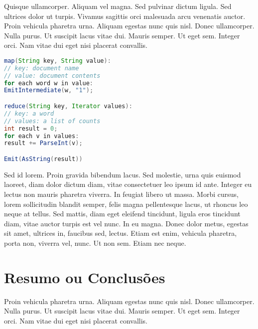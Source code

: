 Quisque ullamcorper. Aliquam vel magna. Sed pulvinar dictum
ligula. Sed ultrices dolor ut turpis. Vivamus sagittis orci malesuada
arcu venenatis auctor. Proin vehicula pharetra urna. Aliquam egestas
nunc quis nisl. Donec ullamcorper. Nulla purus. Ut suscipit lacus
vitae dui. Mauris semper. Ut eget sem. Integer orci. Nam vitae dui
eget nisi placerat convallis. 

\begin{lstlisting}[float,language=Java, label=src:mapreduce, caption=Example map and reduce functions for word counting]
map(String key, String value): 
// key: document name 
// value: document contents 
for each word w in value:
EmitIntermediate(w, "1");

reduce(String key, Iterator values):
// key: a word 
// values: a list of counts 
int result = 0;
for each v in values: 
result += ParseInt(v);

Emit(AsString(result))
\end{lstlisting}

Sed id lorem. Proin gravida bibendum lacus. Sed molestie, urna quis
euismod laoreet, diam dolor dictum diam, vitae consectetuer leo ipsum
id ante. Integer eu lectus non mauris pharetra viverra. In feugiat
libero ut massa. Morbi cursus, lorem sollicitudin blandit semper,
felis magna pellentesque lacus, ut rhoncus leo neque at tellus. Sed
mattis, diam eget eleifend tincidunt, ligula eros tincidunt diam,
vitae auctor turpis est vel nunc. In eu magna. Donec dolor metus,
egestas sit amet, ultrices in, faucibus sed, lectus. Etiam est enim,
vehicula pharetra, porta non, viverra vel, nunc. Ut non sem. Etiam nec
neque. 

\section{Resumo ou Conclusões}

Proin vehicula pharetra urna. Aliquam egestas
nunc quis nisl. Donec ullamcorper. Nulla purus. Ut suscipit lacus
vitae dui. Mauris semper. Ut eget sem. Integer orci. Nam vitae dui
eget nisi placerat convallis. 
